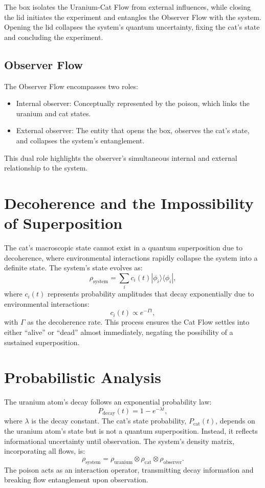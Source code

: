 \documentclass[12pt]{article}
\begin{document}
The box isolates the Uranium-Cat Flow from external influences, while closing the lid initiates the experiment and entangles the Observer Flow with the system. Opening the lid collapses the system's quantum uncertainty, fixing the cat's state and concluding the experiment.

\subsection{Observer Flow}

The Observer Flow encompasses two roles:
\begin{itemize}
\item Internal observer: Conceptually represented by the poison, which links the uranium and cat states.
\item External observer: The entity that opens the box, observes the cat's state, and collapses the system's entanglement.
\end{itemize}

This dual role highlights the observer's simultaneous internal and external relationship to the system.

\section{Decoherence and the Impossibility of Superposition}

The cat's macroscopic state cannot exist in a quantum superposition due to decoherence, where environmental interactions rapidly collapse the system into a definite state. The system's state evolves as:
\[
\rho_{\mathrm{system}} = \sum_i c_i(t)|\phi_i\rangle\langle\phi_i|,
\]
where \(c_i(t)\) represents probability amplitudes that decay exponentially due to environmental interactions:
\[
c_i(t) \propto e^{-\Gamma t},
\]
with \(\Gamma\) as the decoherence rate. This process ensures the Cat Flow settles into either ``alive'' or ``dead'' almost immediately, negating the possibility of a sustained superposition.

\section{Probabilistic Analysis}

The uranium atom's decay follows an exponential probability law:
\[
P_{\mathrm{decay}}(t) = 1 - e^{-\lambda t},
\]
where \(\lambda\) is the decay constant. The cat's state probability, \(P_{\mathrm{cat}}(t)\), depends on the uranium atom's state but is not a quantum superposition. Instead, it reflects informational uncertainty until observation. The system's density matrix, incorporating all flows, is:
\[
\rho_{\mathrm{system}} = \rho_{\mathrm{uranium}} \otimes \rho_{\mathrm{cat}} \otimes \rho_{\mathrm{observer}}.
\]
The poison acts as an interaction operator, transmitting decay information and breaking flow entanglement upon observation.
\end{document}

